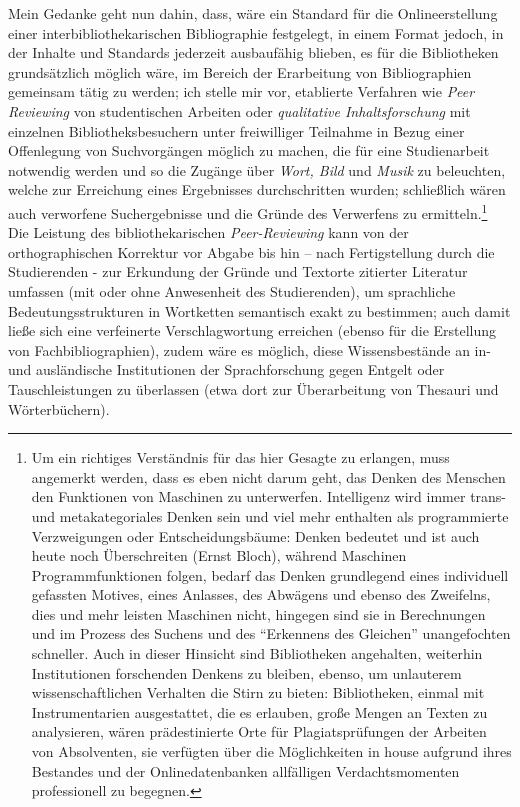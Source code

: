 \documentclass[a4paper,
fontsize=11pt,
oneside,
numbers=noperiodatend,
parskip=half-,
bibliography=totoc,
final
]{scrartcl}
\begin{document}
Mein Gedanke geht nun dahin, dass, wäre ein Standard für die
Onlineerstellung einer interbibliothekarischen Bibliographie festgelegt,
in einem Format jedoch, in der Inhalte und Standards jederzeit
ausbaufähig blieben, es für die Bibliotheken grundsätzlich möglich wäre,
im Bereich der Erarbeitung von Bibliographien gemeinsam tätig zu werden;
ich stelle mir vor, etablierte Verfahren wie \emph{Peer Reviewing} von
studentischen Arbeiten oder \emph{qualitative Inhaltsforschung} mit
einzelnen Bibliotheksbesuchern unter freiwilliger Teilnahme in Bezug
einer Offenlegung von Suchvorgängen möglich zu machen, die für eine
Studienarbeit notwendig werden und so die Zugänge über \emph{Wort, Bild}
und \emph{Musik} zu beleuchten, welche zur Erreichung eines Ergebnisses
durchschritten wurden; schließlich wären auch verworfene Suchergebnisse
und die Gründe des Verwerfens zu ermitteln.\footnote{Um ein richtiges
  Verständnis für das hier Gesagte zu erlangen, muss angemerkt werden,
  dass es eben nicht darum geht, das Denken des Menschen den Funktionen
  von Maschinen zu unterwerfen. Intelligenz wird immer trans- und
  metakategoriales Denken sein und viel mehr enthalten als programmierte
  Verzweigungen oder Entscheidungsbäume: Denken bedeutet und ist auch
  heute noch Überschreiten (Ernst Bloch), während Maschinen
  Programmfunktionen folgen, bedarf das Denken grundlegend eines
  individuell gefassten Motives, eines Anlasses, des Abwägens und ebenso
  des Zweifelns, dies und mehr leisten Maschinen nicht, hingegen sind
  sie in Berechnungen und im Prozess des Suchens und des
  \enquote{Erkennens des Gleichen} unangefochten schneller. Auch in
  dieser Hinsicht sind Bibliotheken angehalten, weiterhin Institutionen
  forschenden Denkens zu bleiben, ebenso, um unlauterem
  wissenschaftlichen Verhalten die Stirn zu bieten: Bibliotheken, einmal
  mit Instrumentarien ausgestattet, die es erlauben, große Mengen an
  Texten zu analysieren, wären prädestinierte Orte für Plagiatsprüfungen
  der Arbeiten von Absolventen, sie verfügten über die Möglichkeiten in
  house aufgrund ihres Bestandes und der Onlinedatenbanken allfälligen
  Verdachtsmomenten professionell zu begegnen.} Die Leistung des
bibliothekarischen \emph{Peer-Reviewing} kann von der orthographischen
Korrektur vor Abgabe bis hin -- nach Fertigstellung durch die
Studierenden - zur Erkundung der Gründe und Textorte zitierter Literatur
umfassen (mit oder ohne Anwesenheit des Studierenden), um sprachliche
Bedeutungsstrukturen in Wortketten semantisch exakt zu bestimmen; auch
damit ließe sich eine verfeinerte Verschlagwortung erreichen (ebenso für
die Erstellung von Fachbibliographien), zudem wäre es möglich, diese
Wissensbestände an in- und ausländische Institutionen der
Sprachforschung gegen Entgelt oder Tauschleistungen zu überlassen (etwa
dort zur Überarbeitung von Thesauri und Wörterbüchern).
\end{document}
